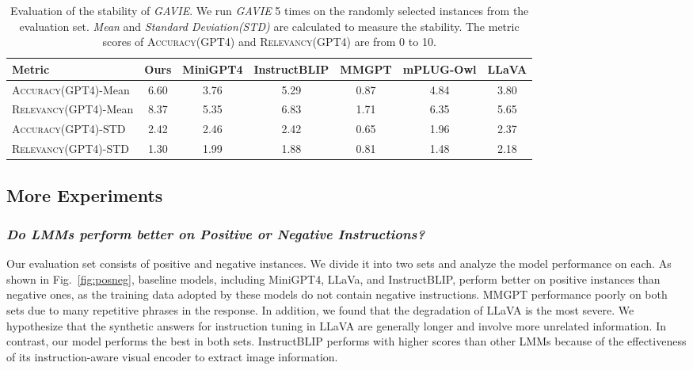 \begin{table}[h]
\setlength\tabcolsep{3pt}
\centering
\small
\begin{tabular}{lcccccc}
\toprule[1.5pt]
Metric& Ours & MiniGPT4 & InstructBLIP & MMGPT& mPLUG-Owl & LLaVA\\
\midrule
\textsc{Accuracy(GPT4)}-Mean&6.60&3.76&5.29&0.87&4.84&3.80\\
\textsc{Relevancy(GPT4)}-Mean&8.37&5.35&6.83&1.71&6.35&5.65\\
\midrule
\textsc{Accuracy(GPT4)}-STD&2.42&2.46&2.42&0.65&1.96&2.37\\
\textsc{Relevancy(GPT4)}-STD&1.30&1.99&1.88&0.81&1.48&2.18\\
\bottomrule
\end{tabular}
\vspace{0.06in}
\caption{Evaluation of the stability of \textit{GAVIE}. We run \textit{GAVIE} 5 times on the randomly selected instances from the evaluation set. \textit{Mean} and \textit{Standard Deviation(STD)} are calculated to measure the stability. The metric scores of \textsc{Accuracy(GPT4)} and \textsc{Relevancy(GPT4)} are from 0 to 10.
}
\label{tab:stability1}
\vspace{-0.2in}
\end{table}

\subsection{More Experiments}
\subsubsection{\textit{Do LMMs perform better on Positive or Negative Instructions? }}
Our evaluation set consists of positive and negative instances. We divide it into two sets and analyze the model performance on each. As shown in Fig.~\ref{fig:posneg}, baseline models, including MiniGPT4, LLaVa, and InstructBLIP,  perform better on positive instances than negative ones, as the training data adopted by these models do not contain negative instructions. MMGPT performance poorly on both sets due to many repetitive phrases in the response. In addition, we found that the degradation of LLaVA is the most severe. We hypothesize that the synthetic answers for instruction tuning in LLaVA are generally longer and involve more unrelated information. In contrast, our model performs the best in both sets. InstructBLIP performs with higher scores than other LMMs because of the effectiveness of its instruction-aware visual encoder to extract image information.





